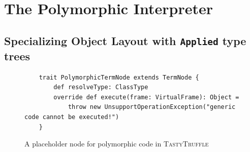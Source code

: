 \section{The Polymorphic Interpreter}
\label{implementation:specialization}

\subsection{Specializing Object Layout with \texttt{Applied} type trees}

\begin{figure}[!htb]
	\begin{verbatim}
	trait PolymorphicTermNode extends TermNode {
		def resolveType: ClassType 
		override def execute(frame: VirtualFrame): Object = 
			throw new UnsupportOperationException("generic code cannot be executed!")
	}
	\end{verbatim}
	\caption{A placeholder node for polymorphic code in \textsc{TastyTruffle}}
\end{figure}

